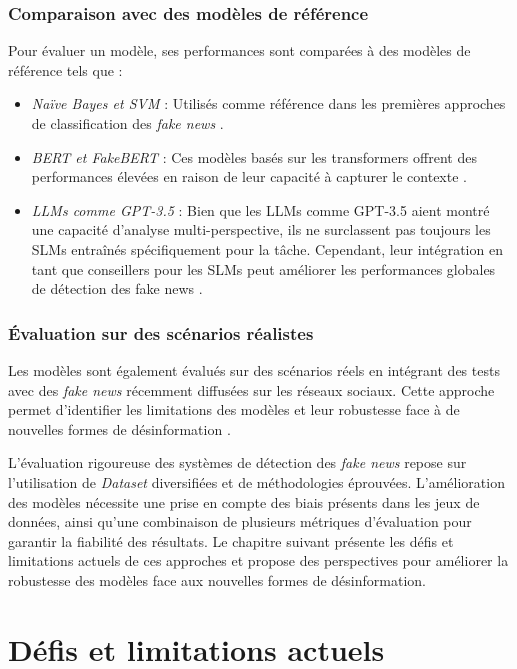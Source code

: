 \documentclass[a4paper,12pt, twocolumn]{article}
\begin{document}
\begin{twocolumn}
\subsubsection{Comparaison avec des modèles de référence} 
Pour évaluer un modèle, ses performances sont comparées à des modèles de référence tels que : 
\begin{itemize} 
    \item \textit{Naïve Bayes et SVM} : Utilisés comme référence dans les premières approches de classification des \textit{fake news} \cite{conroy_automatic_2015}. \item \textit{BERT et FakeBERT} : Ces modèles basés sur les transformers offrent des performances élevées en raison de leur capacité à capturer le contexte \cite{kaliyar_fakebert_2021}. 
    \item \textit{LLMs comme GPT-3.5} : Bien que les LLMs comme GPT-3.5 aient montré une capacité d'analyse multi-perspective, ils ne surclassent pas toujours les SLMs entraînés spécifiquement pour la tâche. Cependant, leur intégration en tant que conseillers pour les SLMs peut améliorer les performances globales de détection des fake news \cite{hu_bad_2024}. 
\end{itemize}

\subsubsection{Évaluation sur des scénarios réalistes} 
Les modèles sont également évalués sur des scénarios réels en intégrant des tests avec des \textit{fake news} récemment diffusées sur les réseaux sociaux. Cette approche permet d’identifier les limitations des modèles et leur robustesse face à de nouvelles formes de désinformation \cite{alghamdi_towards_2023}.

\bigskip
L’évaluation rigoureuse des systèmes de détection des \textit{fake news} repose sur l’utilisation de \textit{Dataset} diversifiées et de méthodologies éprouvées. L’amélioration des modèles nécessite une prise en compte des biais présents dans les jeux de données, ainsi qu’une combinaison de plusieurs métriques d’évaluation pour garantir la fiabilité des résultats. Le chapitre suivant présente les défis et limitations actuels de ces approches et propose des perspectives pour améliorer la robustesse des modèles face aux nouvelles formes de désinformation.

\section{Défis et limitations actuels}
\label{chap:defis_limitations}


\end{twocolumn}
\end{document}
